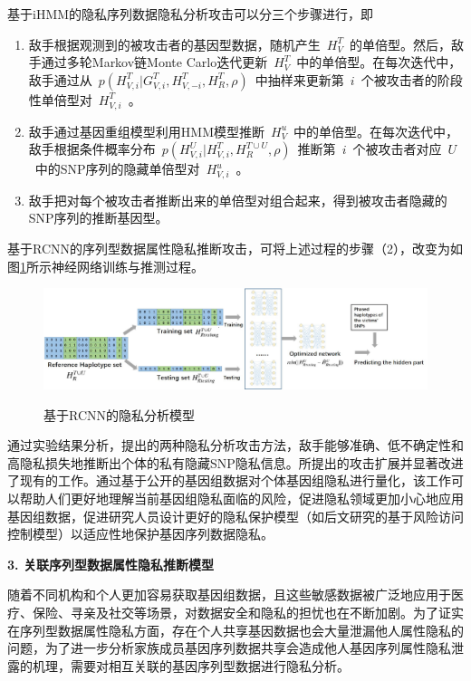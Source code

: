 \documentclass[pdftex,notypeinfo,twoside,openany,UTF8,fntef]{CASthesis}
\theoremstyle{THrm}{
	\newtheorem{question}{Question}[section]
	\newtheorem{property}{性质}[section]
	\newtheorem{assumption}{假设}[section]
	\newtheorem{claim}[lemma]{断言}
	
}
\begin{document}
基于iHMM的隐私序列数据隐私分析攻击可以分三个步骤进行，即

\begin{enumerate}
	\item[(1)] 敌手根据观测到的被攻击者的基因型数据，随机产生~$H_V^T$~的单倍型。然后，敌手通过多轮Markov链Monte Carlo迭代更新~$H_V^T$~中的单倍型。在每次迭代中，敌手通过从~$p(H_{V,i}^T|G_{V,i}^T,H_{V,-i}^T,H_R^T,\rho)$~中抽样来更新第~$i$~个被攻击者的阶段性单倍型对~$H_{V,i}^T$~。
	\item[(2)] 敌手通过基因重组模型利用HMM模型推断~$H_V^u$~中的单倍型。在每次迭代中，敌手根据条件概率分布~$p(H_{V,i}^U|H_{V,i}^T, H_R^{T \cup U},\rho)$~推断第~$i$~个被攻击者对应~$U$~中的SNP序列的隐藏单倍型对~$H_{V,i}^u$~。 
	\item[(3)] 敌手把对每个被攻击者推断出来的单倍型对组合起来，得到被攻击者隐藏的SNP序列的推断基因型。
\end{enumerate}

基于RCNN的序列型数据属性隐私推断攻击，可将上述过程的步骤（2），改变为如图\ref{fig:rcnn_infer}所示神经网络训练与推测过程。

\begin{figure}[htbp]
	\centering
	\includegraphics[width=0.95\linewidth]{./figures/Fig3-RCNN-inference-attack.eps}\\
	\caption{基于RCNN的隐私分析模型}
	\label{fig:rcnn_infer}
\end{figure}

通过实验结果分析，提出的两种隐私分析攻击方法，敌手能够准确、低不确定性和高隐私损失地推断出个体的私有隐藏SNP隐私信息。所提出的攻击扩展并显著改进了现有的工作。通过基于公开的基因组数据对个体基因组隐私进行量化，该工作可以帮助人们更好地理解当前基因组隐私面临的风险，促进隐私领域更加小心地应用基因组数据，促进研究人员设计更好的隐私保护模型（如后文研究的基于风险访问控制模型）以适应性地保护基因序列数据隐私。

\textbf{3.	关联序列型数据属性隐私推断模型}

随着不同机构和个人更加容易获取基因组数据，且这些敏感数据被广泛地应用于医疗、保险、寻亲及社交等场景，对数据安全和隐私的担忧也在不断加剧。为了证实在序列型数据属性隐私方面，存在个人共享基因数据也会大量泄漏他人属性隐私的问题，为了进一步分析家族成员基因序列数据共享会造成他人基因序列属性隐私泄露的机理，需要对相互关联的基因序列型数据进行隐私分析。
\end{document}
